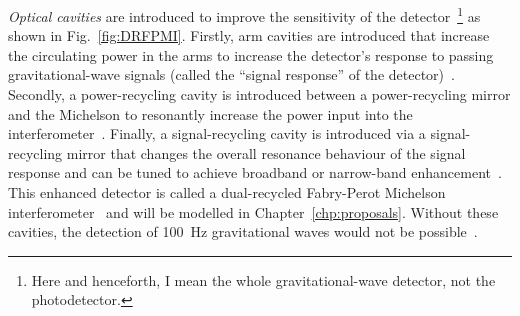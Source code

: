 \emph{Optical cavities} are introduced to improve the sensitivity of the detector~\footnote{Here and henceforth, I mean the whole gravitational-wave detector, not the photodetector.} as shown in Fig.~\ref{fig:DRFPMI}. %
Firstly, arm cavities are introduced that increase the circulating power in the arms to increase the detector's response to passing gravitational-wave signals (called the ``signal response'' of the detector)~\cite{bond_2010}.
Secondly, a power-recycling cavity is introduced between a power-recycling mirror and the Michelson to resonantly increase the power input into the interferometer~\cite{meersRecyclingLaserinterferometricGravitationalwave1988,bond_2010}.
Finally, a signal-recycling cavity is introduced via a signal-recycling mirror that changes the overall resonance behaviour of the signal response and can be tuned to achieve broadband or narrow-band enhancement~\cite{meersRecyclingLaserinterferometricGravitationalwave1988,1995AuJPh..48..953M}.
This enhanced detector is called a dual-recycled Fabry-Perot Michelson interferometer~\cite{meersRecyclingLaserinterferometricGravitationalwave1988,bond_2010} and will be modelled in Chapter~\ref{chp:proposals}. Without these cavities, the detection of 100~Hz gravitational waves would not be possible~\cite{AdvancedLIGO:2015}. %

